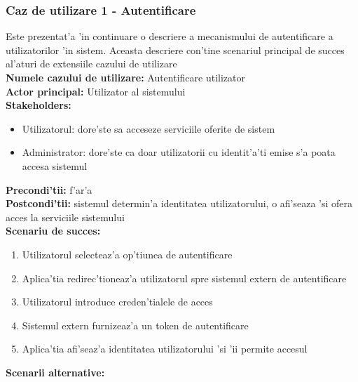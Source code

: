 \documentclass[12pt,a4paper,twoside]{report}
\begin{document}
 \subsubsection{Caz de utilizare 1 - Autentificare}
 Este prezentat'a 'in continuare o descriere a mecanismului de autentificare a utilizatorilor 'in sistem. Aceasta descriere con'tine scenariul principal de succes al'aturi de extensiile cazului de utilizare\\
\textbf{Numele cazului de utilizare:} Autentificare utilizator\\
\textbf{Actor principal:} Utilizator al sistemului\\
\textbf{Stakeholders:}
\begin{itemize}
    \item Utilizatorul: dore'ste sa acceseze serviciile oferite de sistem
    \item Administrator: dore'ste ca doar utilizatorii cu identit'a'ti emise s'a poata accesa sistemul
\end{itemize}
\textbf{Precondi'tii:} f'ar'a\\
\textbf{Postcondi'tii:} sistemul determin'a identitatea utilizatorului, o afi'seaza 'si ofera acces la serviciile sistemului\\
\textbf{Scenariu de succes:} 
\begin{enumerate}
     \item Utilizatorul selecteaz'a op'tiunea de autentificare
     \item Aplica'tia redirec'tioneaz'a utilizatorul spre sistemul extern de autentificare
     \item Utilizatorul introduce creden'tialele de acces
     \item Sistemul extern furnizeaz'a un token de autentificare
     \item  Aplica'tia afi'seaz'a identitatea utilizatorului 'si 'ii permite accesul
\end{enumerate}
\textbf{Scenarii alternative:}
\end{document}
